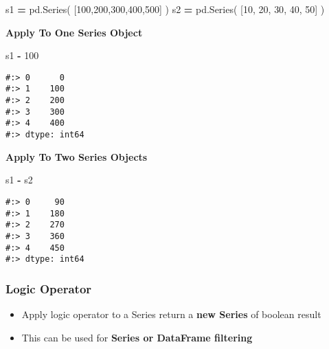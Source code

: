 \documentclass[
]{book}
\newenvironment{Shaded}{\begin{snugshade}}{\end{snugshade}}
\newcommand{\DecValTok}[1]{\textcolor[rgb]{0.06,0.06,0.06}{#1}}
\newcommand{\NormalTok}[1]{#1}
\newcommand{\OperatorTok}[1]{\textcolor[rgb]{0.43,0.43,0.43}{\textbf{#1}}}
\providecommand{\tightlist}{%
  \setlength{\itemsep}{0pt}\setlength{\parskip}{0pt}}
\begin{document}
\begin{Shaded}
\begin{Highlighting}[]
\NormalTok{s1 }\OperatorTok{=}\NormalTok{ pd.Series( [}\DecValTok{100}\NormalTok{,}\DecValTok{200}\NormalTok{,}\DecValTok{300}\NormalTok{,}\DecValTok{400}\NormalTok{,}\DecValTok{500}\NormalTok{] )}
\NormalTok{s2 }\OperatorTok{=}\NormalTok{ pd.Series( [}\DecValTok{10}\NormalTok{, }\DecValTok{20}\NormalTok{, }\DecValTok{30}\NormalTok{, }\DecValTok{40}\NormalTok{, }\DecValTok{50}\NormalTok{] )}
\end{Highlighting}
\end{Shaded}

\textbf{Apply To One Series Object}

\begin{Shaded}
\begin{Highlighting}[]
\NormalTok{s1 }\OperatorTok{{-}} \DecValTok{100}
\end{Highlighting}
\end{Shaded}

\begin{verbatim}
#:> 0      0
#:> 1    100
#:> 2    200
#:> 3    300
#:> 4    400
#:> dtype: int64
\end{verbatim}

\textbf{Apply To Two Series Objects}

\begin{Shaded}
\begin{Highlighting}[]
\NormalTok{s1 }\OperatorTok{{-}}\NormalTok{ s2}
\end{Highlighting}
\end{Shaded}

\begin{verbatim}
#:> 0     90
#:> 1    180
#:> 2    270
#:> 3    360
#:> 4    450
#:> dtype: int64
\end{verbatim}

\hypertarget{logic-operator}{%
\subsubsection{Logic Operator}\label{logic-operator}}

\begin{itemize}
\tightlist
\item
  Apply logic operator to a Series return a \textbf{new Series} of boolean result\\
\item
  This can be used for \textbf{Series or DataFrame filtering}
\end{itemize}
\end{document}
